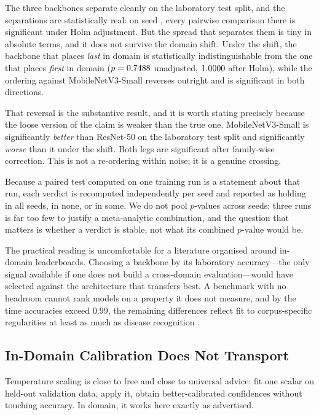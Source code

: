 \documentclass[runningheads]{llncs}
\begin{document}
The three backbones separate cleanly on the laboratory test split, and the
separations are statistically real: on seed \SigSeed{}, every pairwise
comparison there is significant under Holm adjustment. But the spread that
separates them is tiny in absolute terms, and it does not survive the domain
shift. Under the shift, the backbone that places \emph{last} in domain is
statistically indistinguishable from the one that places \emph{first} in domain
($p = 0.7488{}$ unadjusted, $1.0000{}$ after Holm), while the
ordering against MobileNetV3-Small reverses outright and is significant in both
directions.

That reversal is the substantive result, and it is worth stating precisely
because the loose version of the claim is weaker than the true one.
MobileNetV3-Small is significantly \emph{better} than ResNet-50 on the
laboratory test split and significantly \emph{worse} than it under the shift.
Both legs are significant after family-wise correction. This is not a
re-ordering within noise; it is a genuine crossing.

Because a paired test computed on one training run is a statement about that
run, each verdict is recomputed independently per seed and reported as holding
in all seeds, in none, or in some. We do not pool $p$-values across seeds: three
runs is far too few to justify a meta-analytic combination, and the question
that matters is whether a verdict is stable, not what its combined $p$-value
would be.

The practical reading is uncomfortable for a literature organised around
in-domain leaderboards. Choosing a backbone by its laboratory accuracy---the
only signal available if one does not build a cross-domain evaluation---would
have selected against the architecture that transfers best. A benchmark with no
headroom cannot rank models on a property it does not measure, and by the time
accuracies exceed $0.99$, the remaining differences reflect fit to corpus-specific
regularities at least as much as disease recognition
\cite{torralba2011bias,geirhos2020shortcut}.

\subsection{In-Domain Calibration Does Not Transport}

Temperature scaling \cite{guo2017calibration} is close to free and close to
universal advice: fit one scalar on held-out validation data, apply it, obtain
better-calibrated confidences without touching accuracy. In domain, it works
here exactly as advertised.
\end{document}
